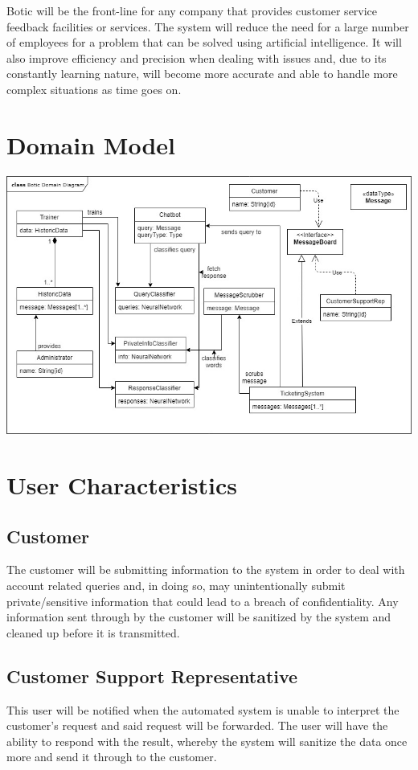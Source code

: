 \documentclass[11pt]{article}
\begin{document}
\begin{flushleft}
Botic will be the front-line for any company that provides customer service feedback facilities or services. The system will reduce the need for a large number of employees for a problem that can be solved using artificial intelligence. It will also improve efficiency and precision when dealing with issues and, due to its constantly learning nature, will become more accurate and able to handle more complex situations as time goes on.\\[0.5cm]
\end{flushleft}

\section{Domain Model}

 \includegraphics[width=1.0\textwidth]{images/Botic_Domain_Diagram.jpg}
 
\section{User Characteristics}
\subsection{Customer}
The customer will be submitting information to the system in order to deal with account related queries and, in doing so, may unintentionally submit private/sensitive information that could lead to a breach of confidentiality. Any information sent through by the customer will be sanitized by the system and cleaned up before it is transmitted.
\subsection{Customer Support Representative}
This user will be notified when the automated system is unable to interpret the customer's request and said request will be forwarded. The user will have the ability to respond with the result, whereby the system will sanitize the data once more and send it through to the customer.
\end{document}
